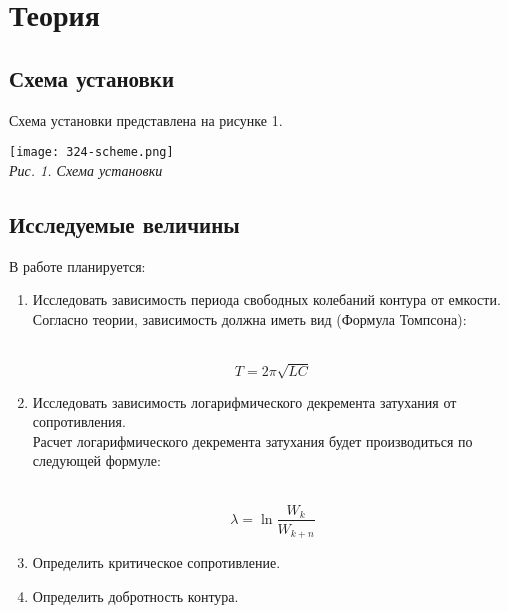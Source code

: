 

\newcommand{\formula}[3]
{
    \noindent#1\\[0.1cm]
    \begin{equation}\label{#2}
        #3
    \end{equation}
}

\newcommand{\mth}[1]
{
    \begin{math}
        #1
    \end{math}
}

\newcommand{\ruB}[1]
{
    _{\text{#1}}
}

\section{Теория}

\subsection {Схема установки}

Схема установки представлена на рисунке 1.

\begin{center}

    \texttt{[image: 324-scheme.png]} \\
    \textit{Рис. 1. Схема установки}

\end{center}

\subsection {Исследуемые величины}

В работе планируется:

\begin{enumerate}
    \item Исследовать зависимость периода свободных колебаний контура от емкости. Согласно теории, зависимость должна иметь вид (Формула Томпсона):

    \formula
    {}
    {Tompson}
    {T = 2\pi \sqrt{LC}}

    \item Исследовать зависимость логарифмического декремента затухания от сопротивления. \\ Расчет логарифмического декремента затухания будет производиться по следующей формуле:

    \formula
    {}
    {Decrement}
    {\lambda = \ln\frac{W_k}{W_{k+n}}}

    \item Определить критическое сопротивление.

    \item Определить добротность контура.

\end{enumerate}